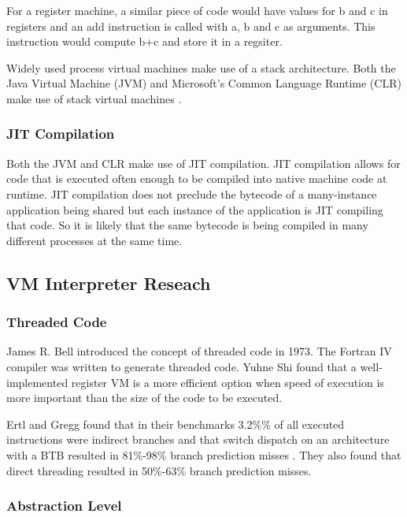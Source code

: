 \documentclass[english,a4paper]{article}
\begin{document}
For a register machine, a similar piece of code would have values for
b and c in registers and an add instruction is called with a, b and c
as arguments. This instruction would compute b+c and store it in a
regsiter.

Widely used process virtual machines make use of a stack
architecture. Both the Java Virtual Machine (JVM) and Microsoft's
Common Language Runtime (CLR) make use of stack virtual machines
\cite{CLI}\cite{JVM}.

\subsubsection{JIT Compilation}

Both the JVM and CLR make use of JIT compilation\cite{JJIT}. JIT
compilation allows for code that is executed often enough to be
compiled into native machine code at runtime. JIT compilation does not
preclude the bytecode of a many-instance application being shared but
each instance of the application is JIT compiling that code. So it is
likely that the same bytecode is being compiled in many different
processes at the same time.

\subsection{VM Interpreter Reseach}



\subsubsection{Threaded Code}

James R. Bell introduced the concept of threaded code in 1973. The
Fortran IV compiler was written to generate threaded code.\cite{Bell}
Yuhne Shi\cite{Shi2007} found that a well-implemented register VM is a
more efficient option when speed of execution is more important than
the size of the code to be executed.

Ertl and Gregg found that in their benchmarks 3.2\%\% of
all executed instructions were indirect branches and that switch
dispatch on an architecture with a BTB resulted in 81\%-98\% branch
prediction misses \cite{EfficientInterpreters}. They also found that
direct threading resulted in 50\%-63\% branch prediction misses.

\subsubsection{Abstraction Level}
\end{document}
